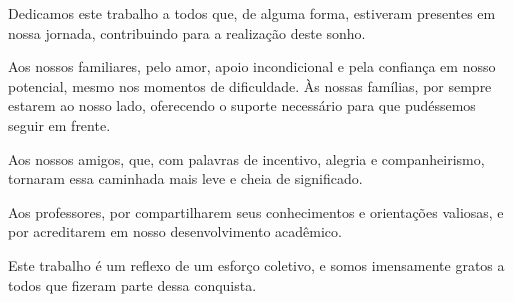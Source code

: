 \newpage
\thispagestyle{empty}
\begin{dedicatoria}
\vspace*{\fill}
Dedicamos este trabalho a todos que, de alguma forma, estiveram presentes em nossa jornada, contribuindo para a realização deste sonho.

\vspace{5mm}

Aos nossos familiares, pelo amor, apoio incondicional e pela confiança em nosso potencial, mesmo nos momentos de dificuldade. Às nossas famílias, por sempre estarem ao nosso lado, oferecendo o suporte necessário para que pudéssemos seguir em frente.

\vspace{5mm}

Aos nossos amigos, que, com palavras de incentivo, alegria e companheirismo, tornaram essa caminhada mais leve e cheia de significado.

\vspace{5mm}

Aos professores, por compartilharem seus conhecimentos e orientações valiosas, e por acreditarem em nosso desenvolvimento acadêmico.

\vspace{5mm}

Este trabalho é um reflexo de um esforço coletivo, e somos imensamente gratos a todos que fizeram parte dessa conquista.
\vspace*{\fill}
\end{dedicatoria}
